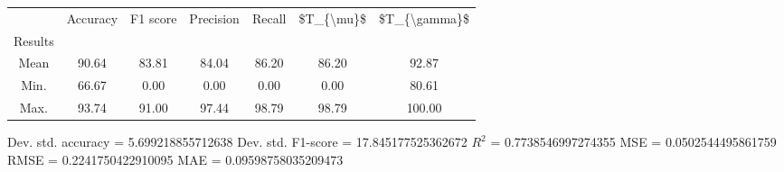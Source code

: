 \begin{tabular}{|c|c|c|c|c|c|c|}
\toprule
{} &  Accuracy &  F1 score &  Precision &  Recall &  \$T\_\{\textbackslash mu\}\$ &  \$T\_\{\textbackslash gamma\}\$ \\
Results &           &           &            &         &            &               \\
\hline
Mean    &     90.64 &     83.81 &      84.04 &   86.20 &      86.20 &         92.87 \\
Min.    &     66.67 &      0.00 &       0.00 &    0.00 &       0.00 &         80.61 \\
Max.    &     93.74 &     91.00 &      97.44 &   98.79 &      98.79 &        100.00 \\
\bottomrule
\end{tabular}

 Dev. std. accuracy = 5.699218855712638
 Dev. std. F1-score = 17.845177525362672
 $R^2$ = 0.7738546997274355
 MSE = 0.0502544495861759
 RMSE = 0.2241750422910095
 MAE = 0.09598758035209473